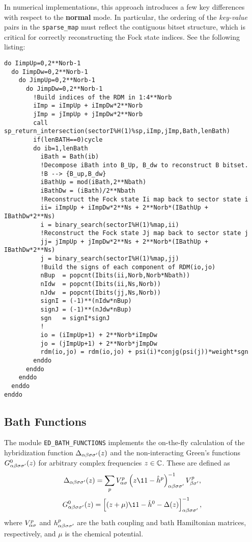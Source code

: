 \documentclass[edipack_sp.tex]{subfiles}
\begin{document}
  
In numerical implementations, this approach introduces a few 
key differences with respect to the {\bf normal} mode.
In particular, the 
ordering of the \emph{key-value} pairs in the {\tt sparse\_map} 
must reflect the contiguous bitset structure, which is critical 
for correctly reconstructing the Fock state indices.
See the following listing:
\begin{lstlisting}[style=fstyle,numbers=none,basicstyle={\scriptsize\ttfamily}]
do IimpUp=0,2**Norb-1
  do IimpDw=0,2**Norb-1
    do JimpUp=0,2**Norb-1
      do JimpDw=0,2**Norb-1
        !Build indices of the RDM in 1:4**Norb
        iImp = iImpUp + iImpDw*2**Norb
        jImp = jImpUp + jImpDw*2**Norb
        call sp_return_intersection(sectorI%H(1)%sp,iImp,jImp,Bath,lenBath)
        if(lenBATH==0)cycle
        do ib=1,lenBath
          iBath = Bath(ib)
          !Decompose iBath into B_Up, B_dw to reconstruct B bitset. 
          !B --> {B_up,B_dw}
          iBathUp = mod(iBath,2**Nbath)
          iBathDw = (iBath)/2**Nbath
          !Reconstruct the Fock state Ii map back to sector state i
          ii= iImpUp + iImpDw*2**Ns + 2**Norb*(IBathUp + IBathDw*2**Ns)
          i = binary_search(sectorI%H(1)%map,ii)
          !Reconstruct the Fock state Jj map back to sector state j
          jj= jImpUp + jImpDw*2**Ns + 2**Norb*(IBathUp + IBathDw*2**Ns)
          j = binary_search(sectorI%H(1)%map,jj)
          !Build the signs of each component of RDM(io,jo)
          nBup  = popcnt(Ibits(ii,Norb,Norb*Nbath))
          nIdw  = popcnt(Ibits(ii,Ns,Norb))
          nJdw  = popcnt(Ibits(jj,Ns,Norb))
          signI = (-1)**(nIdw*nBup)
          signJ = (-1)**(nJdw*nBup)
          sgn   = signI*signJ
          !  
          io = (iImpUp+1) + 2**Norb*iImpDw
          jo = (jImpUp+1) + 2**Norb*jImpDw
          rdm(io,jo) = rdm(io,jo) + psi(i)*conjg(psi(j))*weight*sgn
        enddo
      enddo
    enddo
  enddo
enddo
\end{lstlisting}


\subsection{Bath Functions}\label{sSecFunc}
The module {\tt ED\_BATH\_FUNCTIONS} implements the on-the-fly 
calculation of the hybridization function 
$\Delta_{\alpha\beta\sigma\sigma'}(z)$ and the non-interacting Green's functions 
$G^0_{\alpha\beta\sigma\sigma'}(z)$ for arbitrary complex frequencies $z \in \mathbb{C}$. 
These are defined as
\begin{equation}
\Delta_{\a\b\s\s'}(z) = \sum_p V^p_{\a\s} 
\left( z\11 - \hat{h}^p \right)_{\a\b\s\s'}^{-1} V^p_{\b\s'},
\end{equation}
\begin{equation}
G^0_{\a\b\s\s'}(z) = 
\left[ (z + \mu)\11 - \hat{h}^0 - 
\Delta(z) \right]_{\a\b\s\s'}^{-1},
\end{equation}
where $V^p_{\alpha\sigma}$ and $h^p_{\alpha\beta\sigma\sigma'}$ are the bath coupling 
and bath Hamiltonian matrices, respectively, and $\mu$ is the chemical 
potential.
\end{document}

